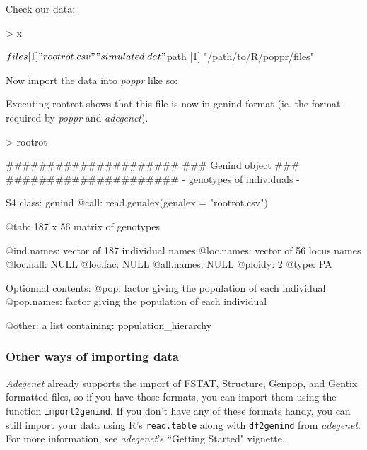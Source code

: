 \documentclass[letterpaper]{article}
\newcommand{\tab}{\hspace*{1em}}
\begin{document}
Check our data:
\begin{Schunk}
\begin{Sinput}
> x
\end{Sinput}
\begin{Soutput}
$files
[1] "rootrot.csv"   "simulated.dat"

$path
[1] "/path/to/R/poppr/files"
\end{Soutput}
\end{Schunk}
Now import the data into \textit{poppr} like so:
\begin{Schunk}
\end{Schunk}
Executing rootrot shows that this file is now in genind format (ie. the format required by \textit{poppr} and \textit{adegenet}).
\begin{Schunk}
\begin{Sinput}
> rootrot
\end{Sinput}
\end{Schunk}
\begin{Schunk}
\begin{Soutput}
   #####################
   ### Genind object ### 
   #####################
- genotypes of individuals - 

S4 class:  genind
@call: read.genalex(genalex = "rootrot.csv")

@tab:  187 x 56 matrix of genotypes

@ind.names: vector of  187 individual names
@loc.names: vector of  56 locus names
@loc.nall: NULL
@loc.fac: NULL
@all.names: NULL
@ploidy:  2
@type:  PA

Optionnal contents: 
@pop:  factor giving the population of each individual
@pop.names:  factor giving the population of each individual

@other: a list containing: population_hierarchy 
\end{Soutput}
\end{Schunk}
\subsubsection{Other ways of importing data}

\tab\tab \textit{Adegenet} already supports the import of FSTAT, Structure, Genpop, and Gentix formatted files, so if you have those formats, you can import them using the function \texttt{import2genind}. If you don't have any of these formats handy, you can still import your data using R's \texttt{read.table} along with \texttt{df2genind} from \textit{adegenet}. For more information, see \textit{adegenet}'s ``Getting Started" vignette.
\end{document}
